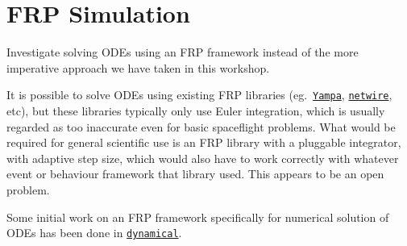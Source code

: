 \documentclass[12pt,openany]{book}
\newcommand{\hspackage}[1]{\href{http://hackage.haskell.org/package/#1}{\texttt{#1}}}
\begin{document}
\section{FRP Simulation}

Investigate solving ODEs using an FRP framework instead of the more imperative approach we have taken in this workshop.

It is possible to solve ODEs using existing FRP libraries (eg.\ \hspackage{Yampa}, \hspackage{netwire}, etc), but these libraries typically only use Euler integration, which is usually regarded as too inaccurate even for basic spaceflight problems. What would be required for general scientific use is an FRP library with a pluggable integrator, with adaptive step size, which would also have to work correctly with whatever event or behaviour framework that library used. This appears to be an open problem.

Some initial work on an FRP framework specifically for numerical solution of ODEs has been done in \href{https://github.com/luke-clifton/dynamical/}{\texttt{dynamical}}.

\printunsrtglossary[type=symbols,style=long]

\clearpage{}
{}


\end{document}
